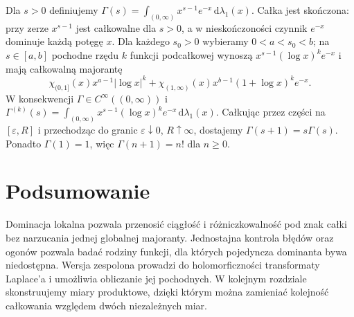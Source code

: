 \begin{przyklad}
\label{ex:gamma-param-11}
Dla $s>0$ definiujemy
$\Gamma(s)=\int_{(0,\infty)}x^{s-1}e^{-x}\,\mathrm d\lambda_1(x)$.
Całka jest skończona: przy zerze $x^{s-1}$ jest
całkowalne dla $s>0$, a w nieskończoności czynnik
$e^{-x}$ dominuje każdą potęgę $x$.
Dla każdego $s_0>0$ wybieramy $0<a<s_0<b$;
na $s\in[a,b]$ pochodne rzędu $k$ funkcji podcałkowej
wynoszą $x^{s-1}(\log x)^k e^{-x}$ i mają całkowalną
majorantę
\[
\chi_{(0,1]}(x)x^{a-1}|\log x|^k
+\chi_{(1,\infty)}(x)x^{b-1}(1+\log x)^k e^{-x}.
\]
W konsekwencji $\Gamma\in C^\infty((0,\infty))$ i
$\Gamma^{(k)}(s)=\int_{(0,\infty)}
 x^{s-1}(\log x)^k e^{-x}\,\mathrm d\lambda_1(x)$.
Całkując przez części na $[\varepsilon,R]$ i przechodząc
do granic $\varepsilon\downarrow0$, $R\uparrow\infty$,
dostajemy $\Gamma(s+1)=s\Gamma(s)$.
Ponadto $\Gamma(1)=1$, więc $\Gamma(n+1)=n!$ dla $n\ge0$.
\end{przyklad}

\section{Podsumowanie}
Dominacja lokalna pozwala przenosić ciągłość i
różniczkowalność pod znak całki bez narzucania
jednej globalnej majoranty. Jednostajna kontrola
błędów oraz ogonów pozwala badać rodziny funkcji,
dla których pojedyncza dominanta bywa niedostępna.
Wersja zespolona prowadzi do holomorficzności
transformaty Laplace'a i umożliwia obliczanie jej
pochodnych. W kolejnym rozdziale skonstruujemy
miary produktowe, dzięki którym można zamieniać
kolejność całkowania względem dwóch niezależnych
miar.
